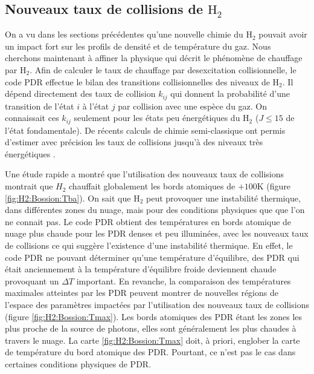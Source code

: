 \subsection{Nouveaux taux de collisions de $\mathrm{H}_2$}

On a vu dans les sections précédentes qu'une nouvelle chimie du $\mathrm{H}_2$ pouvait avoir un impact fort sur les profils de densité et de température du gaz. Nous cherchons maintenant à affiner la physique qui décrit le phénomène de chauffage par $\mathrm{H}_2$. Afin de calculer le taux de chauffage par desexcitation collisionnelle, le code PDR effectue le bilan des transitions collisionnelles des niveaux de $\mathrm{H}_2$. Il dépend directement des taux de collision $k_{ij}$ qui donnent la probabilité d'une transition de l'état $i$ à l'état $j$ par collision avec une espèce du gaz. On connaissait ces $k_{ij}$ seulement pour les états peu énergétiques du $\mathrm{H}_2$ ($J\leq15$ de l'état fondamentale). De récents calculs de chimie semi-classique ont permis d'estimer avec précision les taux de collisions jusqu'à des niveaux très énergétiques \cite{Bossion}. \newline 


Une étude rapide a montré que l'utilisation des nouveaux taux de collisions montrait que $H_2$ chauffait globalement les bords atomiques de $+100$K (figure \ref{fig:H2:Bossion:Tba}). On sait que $\mathrm{H}_2$ peut provoquer une instabilité thermique, dans différentes zones du nuage, mais pour des conditions physiques que que l'on ne connait pas. Le code PDR obtient des températures en bords atomique de nuage plus chaude pour les PDR denses et peu illuminées, avec les nouveaux taux de collisions ce qui suggère l'existence d'une instabilité thermique. En effet, le code PDR ne pouvant déterminer qu'une température d'équilibre, des PDR qui était anciennement à la température d'équilibre froide deviennent chaude provoquant un $\Delta T$ important. \newline 
En revanche, la comparaison des températures maximales atteintes par les PDR peuvent montrer de nouvelles régions de l'espace des paramètres impactées par l'utilisation des nouveaux taux de collisions (figure \ref{fig:H2:Bossion:Tmax}). Les bords atomiques des PDR étant les zones les plus proche de la source de photons, elles sont généralement les plus chaudes à travers le nuage. La carte \ref{fig:H2:Bossion:Tmax} doit, à priori, englober la carte de température du bord atomique des PDR. Pourtant, ce n'est pas le cas dans certaines conditions physiques de PDR. 

